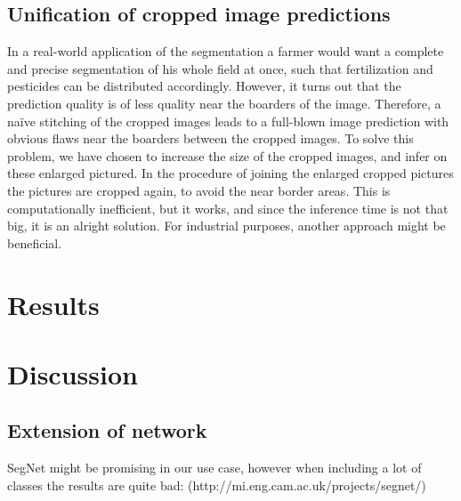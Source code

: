 \documentclass[12pt,fleqn]{article}
\begin{document}
\subsection{Unification of cropped image predictions}
In a real-world application of the segmentation a farmer would want a complete and precise segmentation of his whole field at once, such that fertilization and pesticides can be distributed accordingly. However, it turns out that the prediction quality is of less quality near the boarders of the image. Therefore, a naïve stitching of the cropped images leads to a full-blown image prediction with obvious flaws near the boarders between the cropped images. To solve this problem, we have chosen to increase the size of the cropped images, and infer on these enlarged pictured. In the procedure of joining the enlarged cropped pictures the pictures are cropped again, to avoid the near border areas. This is computationally inefficient, but it works, and since the inference time is not that big, it is an alright solution. For industrial purposes, another approach might be beneficial.
\section{Results}



\section{Discussion}

\subsection{Extension of network}
SegNet might be promising in our use case, however when including a lot of classes the results are quite bad: (http://mi.eng.cam.ac.uk/projects/segnet/) 
\end{document}
